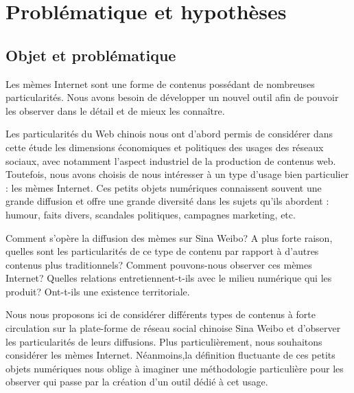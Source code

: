 \chapter*{Problématique et hypothèses}


\section{Objet et problématique} 

Les mèmes Internet sont une forme de contenus possédant de nombreuses particularités. Nous avons besoin de développer un nouvel outil afin de pouvoir les observer dans le détail et de mieux les connaître.

Les particularités du Web chinois nous ont d{\textquoteright}abord  permis de considérer dans cette étude les dimensions économiques  et politiques des usages des réseaux sociaux, avec notamment  l{\textquoteright}aspect industriel de la production de contenus web.  Toutefois, nous avons choisis de nous intéresser à un type  d{\textquoteright}usage bien particulier : les mèmes Internet. Ces  petits objets numériques connaissent souvent une grande diffusion et  offre une grande diversité dans les sujets qu{\textquoteright}ils  abordent : humour, faits divers, scandales politiques, campagnes  marketing, etc.

Comment s'opère la diffusion des mèmes sur Sina Weibo? A plus forte raison, quelles sont les particularités de ce type de contenu par rapport à d'autres contenus plus traditionnels? Comment pouvons-nous observer ces mèmes Internet? Quelles relations entretiennent-t-ils avec le milieu numérique qui les produit? Ont-t-ils une existence territoriale.

Nous nous proposons ici de considérer différents types de contenus à forte circulation sur la plate-forme de réseau social chinoise Sina Weibo et d'observer les particularités de leurs diffusions. Plus particulièrement, nous souhaitons considérer les mèmes Internet. Néanmoins,la définition fluctuante de ces petits objets numériques nous oblige à imaginer une méthodologie particulière pour les observer qui passe par la création d'un outil dédié à cet usage.


